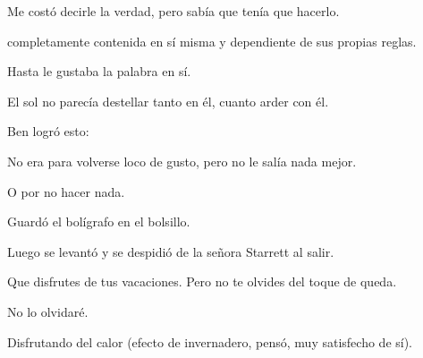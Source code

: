\sk
Me costó decirle la verdad, pero sabía que tenía que hacerlo. 

\sk
completamente contenida en sí misma y
dependiente de sus propias reglas.

\sk
Hasta le gustaba la palabra en sí.

\sk
El sol no parecía destellar tanto en él,
cuanto arder con él.

\sk
Ben logró esto: 

\sk
No era para volverse loco de gusto, pero no le
salía nada mejor.

\sk
O por no hacer nada. 

\sk
Guardó el bolígrafo en el bolsillo. 

\sk
Luego se levantó y se
despidió de la señora Starrett al salir.

\sk
Que disfrutes de
tus vacaciones. Pero no te olvides del toque de queda.

\sk
No lo olvidaré. 

\sk
Disfrutando del calor (efecto
de invernadero, pensó, muy satisfecho de sí).

\sk
\nb{}

\sk
\nb{}

\sk
\nb{}

\sk
\nb{}

\sk
\nb{}

\sk
\nb{}

\sk
\nb{}

\sk
\nb{}

\sk
\nb{}

\sk
\nb{}


